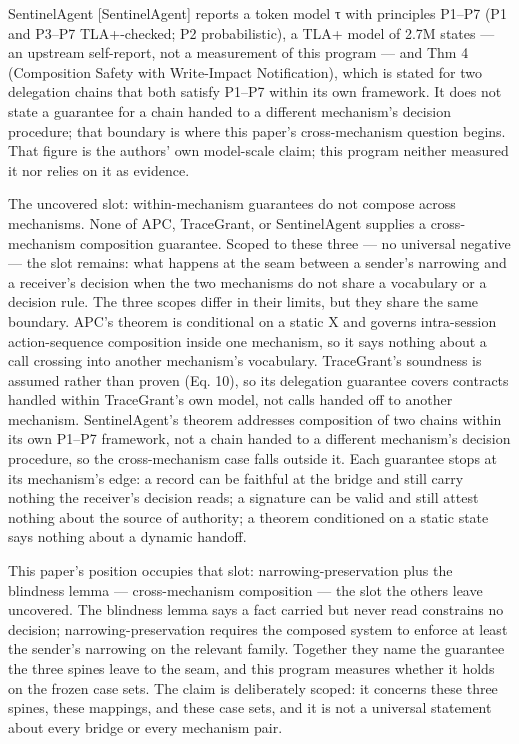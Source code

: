 \documentclass[
  10pt,
]{article}
\renewcommand{\_}{\origunderscore\allowbreak}
\begin{document}
SentinelAgent {[}SentinelAgent{]} reports a token model τ with
principles P1--P7 (P1 and P3--P7 TLA+-checked; P2 probabilistic), a TLA+
model of 2.7M states --- an upstream self-report, not a measurement of
this program --- and Thm 4 (Composition Safety with Write-Impact
Notification), which is stated for two delegation chains that both
satisfy P1--P7 within its own framework. It does not state a guarantee
for a chain handed to a different mechanism's decision procedure; that
boundary is where this paper's cross-mechanism question begins. That
figure is the authors' own model-scale claim; this program neither
measured it nor relies on it as evidence.

The uncovered slot: within-mechanism guarantees do not compose across
mechanisms. None of APC, TraceGrant, or SentinelAgent supplies a
cross-mechanism composition guarantee. Scoped to these three --- no
universal negative --- the slot remains: what happens at the seam
between a sender's narrowing and a receiver's decision when the two
mechanisms do not share a vocabulary or a decision rule. The three
scopes differ in their limits, but they share the same boundary. APC's
theorem is conditional on a static X and governs intra-session
action-sequence composition inside one mechanism, so it says nothing
about a call crossing into another mechanism's vocabulary. TraceGrant's
soundness is assumed rather than proven (Eq. 10), so its delegation
guarantee covers contracts handled within TraceGrant's own model, not
calls handed off to another mechanism. SentinelAgent's theorem addresses
composition of two chains within its own P1--P7 framework, not a chain
handed to a different mechanism's decision procedure, so the
cross-mechanism case falls outside it. Each guarantee stops at its
mechanism's edge: a record can be faithful at the bridge and still carry
nothing the receiver's decision reads; a signature can be valid and
still attest nothing about the source of authority; a theorem
conditioned on a static state says nothing about a dynamic handoff.

This paper's position occupies that slot: narrowing-preservation plus
the blindness lemma --- cross-mechanism composition --- the slot the
others leave uncovered. The blindness lemma says a fact carried but
never read constrains no decision; narrowing-preservation requires the
composed system to enforce at least the sender's narrowing on the
relevant family. Together they name the guarantee the three spines leave
to the seam, and this program measures whether it holds on the frozen
case sets. The claim is deliberately scoped: it concerns these three
spines, these mappings, and these case sets, and it is not a universal
statement about every bridge or every mechanism pair.
\end{document}
